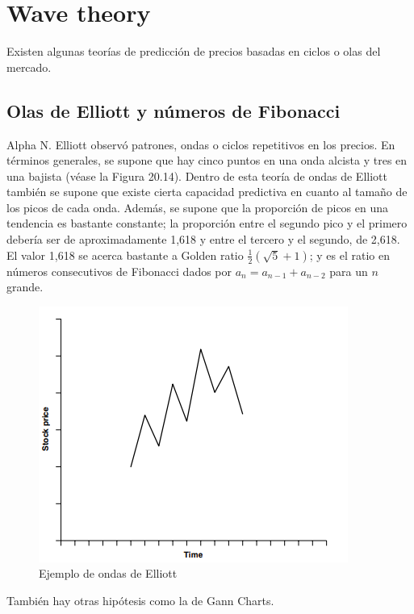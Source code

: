\section{Wave theory}
Existen algunas teorías de predicción de precios basadas en ciclos o olas del mercado.

\subsection{Olas de Elliott y números de Fibonacci}
Alpha N. Elliott observó patrones, ondas o ciclos repetitivos en los precios. En términos generales, se supone que hay cinco puntos en una onda alcista y tres en una bajista (véase la Figura 20.14). Dentro de esta teoría de ondas de Elliott también se supone que existe cierta capacidad predictiva en cuanto al tamaño de los picos de cada onda. Además, se supone que la proporción de picos en una tendencia es bastante constante; la proporción entre el segundo pico y el primero debería ser de aproximadamente 1,618 y entre el tercero y el segundo, de 2,618. El valor 1,618 se acerca bastante a Golden ratio $\frac{1}{2}(\sqrt{5}+1)$; y es el ratio en números consecutivos de Fibonacci dados por $a_n = a_{n-1}+a_{n-2}$ para un $n$ grande.
\begin{figure}[H]
    \centering
    \includegraphics[width=0.65\linewidth]{Imagenes/16_Prediccion/Elliot waves.png}
    \caption{Ejemplo de ondas de Elliott}
\end{figure}



También hay otras hipótesis como la de Gann Charts.





